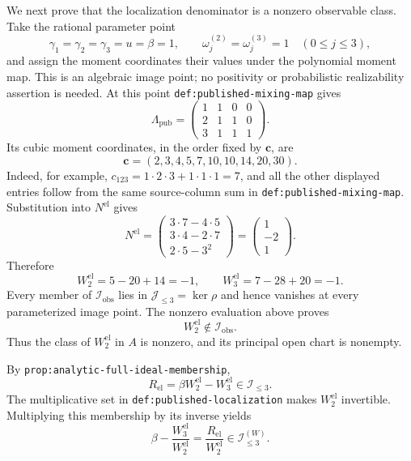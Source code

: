 We next prove that the localization denominator is a nonzero observable class.  Take the rational parameter point
\[
\gamma_1=\gamma_2=\gamma_3=u=\beta=1,
\qquad
\omega_j^{(2)}=\omega_j^{(3)}=1
\quad(0\leq j\leq3),
\]
and assign the moment coordinates their values under the polynomial moment map.  This is an algebraic image point; no positivity or probabilistic realizability assertion is needed.  At this point \texttt{def:published-mixing-map} gives
\[
\Lambda_{\mathrm{pub}}=
\begin{pmatrix}
1&1&0&0\\
2&1&1&0\\
3&1&1&1
\end{pmatrix}.
\]
Its cubic moment coordinates, in the order fixed by \(\mathbf c\), are
\[
\mathbf c=(2,3,4,5,7,10,10,14,20,30).
\]
Indeed, for example, \(c_{123}=1\cdot2\cdot3+1\cdot1\cdot1=7\), and all the other displayed entries follow from the same source-column sum in \texttt{def:published-mixing-map}.  Substitution into \(N^{\mathrm{el}}\) gives
\[
N^{\mathrm{el}}
=\begin{pmatrix}
3\cdot7-4\cdot5\\
3\cdot4-2\cdot7\\
2\cdot5-3^2
\end{pmatrix}
=\begin{pmatrix}1\\-2\\1\end{pmatrix}.
\]
Therefore
\[
W_2^{\mathrm{el}}=5-20+14=-1,
\qquad
W_3^{\mathrm{el}}=7-28+20=-1.
\]
Every member of \(\mathcal I_{\mathrm{obs}}\) lies in \(\mathcal J_{\leq3}=\ker\rho\) and hence vanishes at every parameterized image point.  The nonzero evaluation above proves
\[
W_2^{\mathrm{el}}\notin\mathcal I_{\mathrm{obs}}.
\]
Thus the class of \(W_2^{\mathrm{el}}\) in \(A\) is nonzero, and its principal open chart is nonempty.

By \texttt{prop:analytic-full-ideal-membership},
\[
R_{\mathrm{el}}=\beta W_2^{\mathrm{el}}-W_3^{\mathrm{el}}
\in\mathcal I_{\leq3}.
\]
The multiplicative set in \texttt{def:published-localization} makes \(W_2^{\mathrm{el}}\) invertible.  Multiplying this membership by its inverse yields
\[
\beta-\frac{W_3^{\mathrm{el}}}{W_2^{\mathrm{el}}}
=\frac{R_{\mathrm{el}}}{W_2^{\mathrm{el}}}
\in\mathcal I_{\leq3}^{(W)}.
\]

